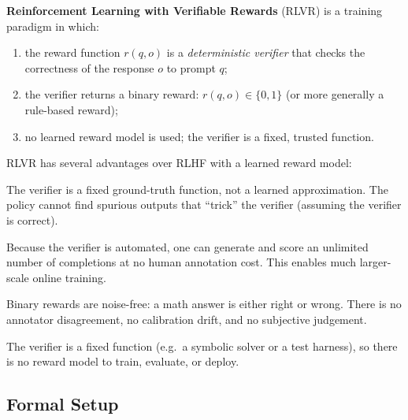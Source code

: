 \begin{definition}[RLVR]
\label{def:rlvr}
\textbf{Reinforcement Learning with Verifiable Rewards} (RLVR) is a training paradigm in which:
\begin{enumerate}[leftmargin=*]
  \item the reward function $r(q, o)$ is a \emph{deterministic verifier} that checks the correctness of the response $o$ to prompt $q$;
  \item the verifier returns a binary reward: $r(q, o) \in \{0, 1\}$ (or more generally a rule-based reward);
  \item no learned reward model is used; the verifier is a fixed, trusted function.
\end{enumerate}
\end{definition}

RLVR has several advantages over RLHF with a learned reward model:
\begin{description}[leftmargin=!,labelwidth=3.5cm]
  \item[No reward hacking] The verifier is a fixed ground-truth function, not a learned approximation.  The policy cannot find spurious outputs that ``trick'' the verifier (assuming the verifier is correct).
  \item[Unlimited data] Because the verifier is automated, one can generate and score an unlimited number of completions at no human annotation cost.  This enables much larger-scale online training.
  \item[Clean signal] Binary rewards are noise-free: a math answer is either right or wrong.  There is no annotator disagreement, no calibration drift, and no subjective judgement.
  \item[No reward model training] The verifier is a fixed function (e.g.\ a symbolic solver or a test harness), so there is no reward model to train, evaluate, or deploy.
\end{description}

\subsection{Formal Setup}

